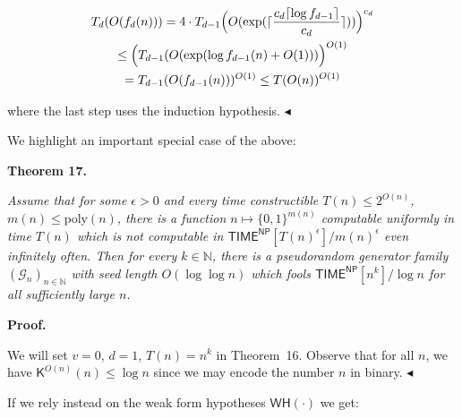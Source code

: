 \[\begin{gathered}
\displaystyle T_{d}(O(f_{d}(n)))=4\cdot T_{d-1}\Bigl{(}O(\exp(\lceil\frac{c_{d}\lceil\log f_{d-1}\rceil}{c_{d}}\rceil))\Bigr{)}^{c_{d}} \\
\displaystyle\leq\Bigl{(}T_{d-1}(O(\exp(\log f_{d-1}(n)+O(1)))\Bigr{)}^{O(1)} \\
\displaystyle=T_{d-1}(O(f_{d-1}(n)))^{O(1)}\leq T(O(n))^{O(1)}
\end{gathered}\]


where the last step uses the induction hypothesis.
$\blacktriangleleft$\par




We highlight an important special case of the above:\par





\par\medskip\noindent\textbf{
\textbf{Theorem 17}\textbf{.}
}\par



\emph{Assume that for some $\epsilon>0$ and every time constructible $T(n)\leq 2^{O(n)}$, $m(n)\leq\mathrm{poly}(n)$, there is a function $n\mapsto\{0,1\}^{m(n)}$ computable uniformly in time $T(n)$ which is not computable in ${\mathsf{TIME}}^{\mathsf{NP}}[T(n)^{\epsilon}]/m(n)^{\epsilon}$ even infinitely often. Then for every $k\in\mathbb{N}$, there is a pseudorandom generator family $(\mathcal{G}_{n})_{n\in\mathbb{N}}$ with seed length $O(\log\log n)$ which fools ${\mathsf{TIME}}^{{\mathsf{NP}}}[n^{k}]/\log n$ for all sufficiently large $n$.}\par







\par\medskip\noindent\textbf{Proof.}\par




We will set $v=0$, $d=1$, $T(n)=n^{k}$ in Theorem 16. Observe that for all $n$, we have ${\mathsf{K}}^{O(n)}(n)\leq\log n$ since we may encode the number $n$ in binary.
$\blacktriangleleft$\par




If we rely instead on the weak form hypotheses $\mathsf{WH}(\cdot)$ we get:\par



